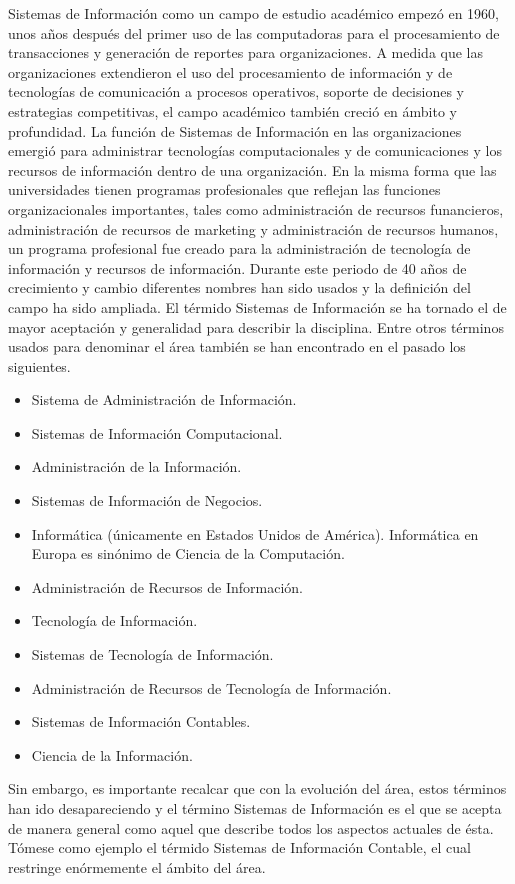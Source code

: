 Sistemas de Información como un campo de estudio académico empezó en 1960, unos años después del primer uso de las
computadoras para el procesamiento de transacciones y generación de reportes para organizaciones. A medida que las
organizaciones extendieron el uso del procesamiento de información y de tecnologí­as de comunicación a procesos
operativos, soporte de decisiones y estrategias competitivas, el campo académico también creció en ámbito y profundidad.
La función de Sistemas de Información en las organizaciones emergió para administrar tecnologí­as computacionales y de
comunicaciones y los recursos de información dentro de una organización. En la misma forma que las universidades tienen
programas profesionales que reflejan las funciones organizacionales importantes, tales como administración de recursos
funancieros, administración de recursos de marketing y administración de recursos humanos, un programa profesional fue
creado para la administración de tecnologí­a de información y recursos de información. Durante este periodo de 40 años de
crecimiento y cambio diferentes nombres han sido usados y la definición del campo ha sido ampliada. El térmido Sistemas
de Información se ha tornado el de mayor aceptación y generalidad para describir la disciplina. Entre otros términos
usados para denominar el área también se han encontrado en el pasado los siguientes.

\begin{itemize}
\item Sistema de Administración de Información.
\item Sistemas de Información Computacional.
\item Administración de la Información.
\item Sistemas de Información de Negocios.
\item Informática (únicamente en Estados Unidos de América). Informática en Europa es sinónimo de Ciencia de la
Computación.
\item Administración de Recursos de Información.
\item Tecnologí­a de Información.
\item Sistemas de Tecnologí­a de Información.
\item Administración de Recursos de Tecnologí­a de Información.
\item Sistemas de Información Contables.
\item Ciencia de la Información.
\end{itemize}
 
Sin embargo, es importante recalcar que con la evolución del área, estos términos han ido desapareciendo y el término
Sistemas de Información es el que se acepta de manera general como aquel que describe todos los aspectos actuales de ésta. 
Tómese como ejemplo el térmido Sistemas de Información Contable, el cual restringe enórmemente el ámbito del área.
 
